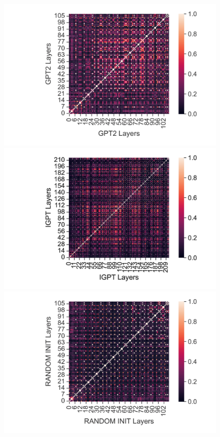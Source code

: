 \documentclass{article}
\begin{document}
\begin{figure}[H]
    \centering
    \begin{minipage}[b]{0.32\linewidth}
        \includegraphics[width=\linewidth]{figs/cka_40_40_gpt2gpt2_hopper_medium_666_state.png}
    \end{minipage}
    \begin{minipage}[b]{0.32\linewidth}
        \includegraphics[width=\linewidth]{figs/cka_40_40_igptigpt_hopper_medium_666_state.png}
    \end{minipage}
    \begin{minipage}[b]{0.32\linewidth}
        \includegraphics[width=\linewidth]{figs/cka_40_40_dtdt_hopper_medium_666_state.png}

\end{minipage}
\end{figure}
\end{document}
